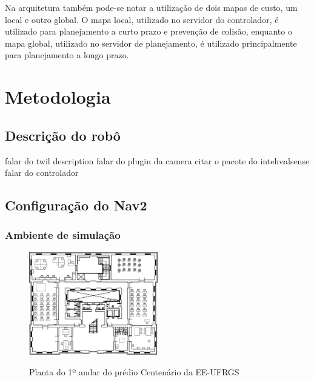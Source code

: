 \documentclass[repeatfields,xlists,xpacks,oneside,yearsonly]{ufrgscca}
\begin{document}
Na arquitetura também pode-se notar a utilização de dois mapas de custo, um local e
outro global.
O mapa local, utilizado no servidor do controlador, é utilizado para planejamento a curto
prazo e prevenção de colisão, enquanto o mapa global, utilizado no servidor de planejamento, é utilizado principalmente
para planejamento a longo prazo.

\chapter{Metodologia}
\label{desenvolvimento}



\section{Descrição do robô}

falar do twil description
falar do plugin da camera
citar o pacote do intelrealsense
falar do controlador

\section{Configuração do Nav2}

\subsection{Ambiente de simulação}
\begin{figure}[htbp]
    {
        \centering
        \caption{Planta do 1º andar do prédio Centenário da EE-UFRGS}
        \label{fig:planta_centenario}
        \includegraphics[width=0.5\textwidth]{centenario_floor_plan.png}\\
    }
    {}
\end{figure}
\end{document}
